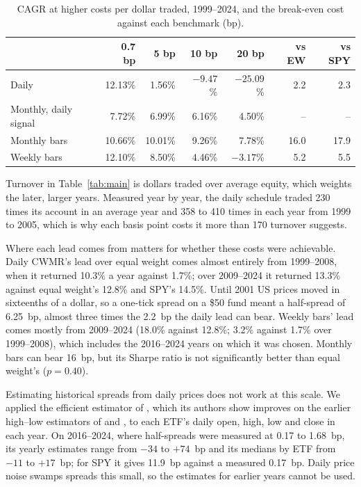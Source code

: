 \documentclass[11pt]{article}
\begin{document}
\begin{table}[ht]
\centering
\caption{CAGR at higher costs per dollar traded, 1999--2024, and the break-even cost against
each benchmark (bp).}\label{tab:costs}
\begin{tabular}{lrrrrrr}
\toprule
 & 0.7 bp & 5 bp & 10 bp & 20 bp & vs EW & vs SPY \\
\midrule
Daily & 12.13\% & 1.56\% & $-9.47$\% & $-25.09$\% & 2.2 & 2.3 \\
Monthly, daily signal & 7.72\% & 6.99\% & 6.16\% & 4.50\% & -- & -- \\
Monthly bars & 10.66\% & 10.01\% & 9.26\% & 7.78\% & 16.0 & 17.9 \\
Weekly bars & 12.10\% & 8.50\% & 4.46\% & $-3.17$\% & 5.2 & 5.5 \\
\bottomrule
\end{tabular}
\end{table}

Turnover in Table~\ref{tab:main} is dollars traded over average equity, which weights the later,
larger years. Measured year by year, the daily schedule traded 230 times its account in an
average year and 358 to 410 times in each year from 1999 to 2005, which is why each basis point
costs it more than 170 turnover suggests.

Where each lead comes from matters for whether these costs were achievable. Daily CWMR's lead
over equal weight comes almost entirely from 1999--2008, when it returned 10.3\% a year against
1.7\%; over 2009--2024 it returned 13.3\% against equal weight's 12.8\% and SPY's 14.5\%. Until
2001 US prices moved in sixteenths of a dollar, so a one-tick spread on a \$50 fund meant a
half-spread of 6.25~bp, almost three times the 2.2~bp the daily lead can bear. Weekly bars' lead comes mostly from 2009--2024
(18.0\% against 12.8\%; 3.2\% against 1.7\% over 1999--2008), which includes the 2016--2024 years
on which it was chosen. Monthly bars can bear 16~bp, but its Sharpe ratio is not significantly
better than equal weight's ($p = 0.40$).

Estimating historical spreads from daily prices does not work at this scale. We applied the
efficient estimator of \citet{ardia2024}, which its authors show improves on the earlier
high--low estimators of \citet{corwin2012} and \citet{abdi2017}, to each ETF's daily open, high,
low and close in each year. On 2016--2024, where half-spreads were measured at 0.17 to 1.68~bp,
its yearly estimates range from $-34$ to $+74$~bp and its medians by ETF from $-11$ to $+17$~bp;
for SPY it gives 11.9~bp against a measured 0.17~bp. Daily price noise swamps spreads this small,
so the estimates for earlier years cannot be used.
\end{document}
